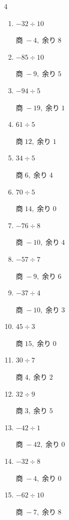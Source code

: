 \begin{multicols}{4}
\begin{enumerate}
  \item $-32 \div 10$

        $商\; -4,\; 余り\; 8$

\columnbreak %

  \item $-85 \div 10$

        $商\; -9,\; 余り\; 5$

  \item $-94 \div 5$

        $商\; -19,\; 余り\; 1$

  \item $61 \div 5$

        $商\; 12,\; 余り\; 1$

  \item $34 \div 5$

        $商\; 6,\; 余り\; 4$

  \item $70 \div 5$

        $商\; 14,\; 余り\; 0$

  \item $-76 \div 8$

        $商\; -10,\; 余り\; 4$

  \item $-57 \div 7$

        $商\; -9,\; 余り\; 6$

  \item $-37 \div 4$

        $商\; -10,\; 余り\; 3$

  \item $45 \div 3$

        $商\; 15,\; 余り\; 0$

  \item $30 \div 7$

        $商\; 4,\; 余り\; 2$

  \item $32 \div 9$

        $商\; 3,\; 余り\; 5$

  \item $-42 \div 1$

        $商\; -42,\; 余り\; 0$

  \item $-32 \div 8$

        $商\; -4,\; 余り\; 0$

  \item $-62 \div 10$

        $商\; -7,\; 余り\; 8$


\end{enumerate}
\end{multicols}
